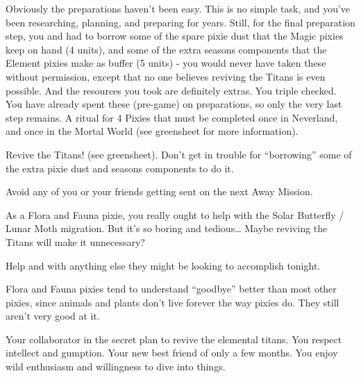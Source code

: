 \documentclass[char]{PP}
\begin{document}
Obviously the preparations haven’t been easy. This is no simple task, and you’ve been researching, planning, and preparing for years. Still, for the final preparation step, you and \cETitan{} had to borrow some of the spare pixie dust that the Magic pixies keep on hand (4 units), and some of the extra seasons components that the Element pixies make as buffer (5 units) - you would never have taken these without permission, except that no one believes reviving the Titans is even possible. And the resources you took are definitely extras. You triple checked. You have already spent these (pre-game) on preparations, so only the very last step remains. A ritual for 4 Pixies that must be completed once in Neverland, and once in the Mortal World (see greensheet for more information).


\begin{itemz}
	\item Revive the Titans! (see greensheet). Don’t get in trouble for “borrowing” some of the extra pixie dust and seasons components to do it.
	\item Avoid any of you or your friends getting sent on the next Away Mission.
	\item As a Flora and Fauna pixie, you really ought to help with the Solar Butterfly / Lunar Moth migration. But it’s so boring and tedious… Maybe reviving the Titans will make it unnecessary?
	\item Help \cETitan{} and \cEAirship{} with anything else they might be looking to accomplish tonight.
\end{itemz}

\begin{itemz}[Notes]
	\item Flora and Fauna pixies tend to understand ``goodbye'' better than most other pixies, since animals and plants don’t live forever the way pixies do. They still aren't very good at it.
\end{itemz}

\begin{contacts}
	\contact{\cETitan{}} Your collaborator in the secret plan to revive the elemental titans. You respect \cETitan{\their} intellect and gumption.
	\contact{\cEAirship{}} Your new best friend of only a few months. You enjoy \cEAirship{\their} wild enthusiasm and willingness to dive into things.
\end{contacts}
\end{document}
